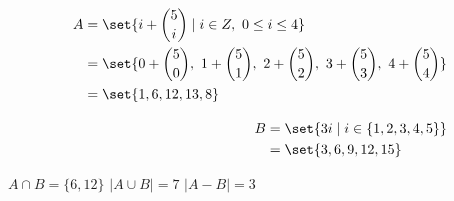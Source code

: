 \documentclass[12pt,twoside]{article}
\begin{document}


\begin{problems}

\problem %
\begin{align}
    \begin{split}
    A &= \set{ i+\binom{5}{i} \mid i \in Z, \ 0 \leq i \leq 4}  \\
      &= \set{ 0+\binom{5}{0}, 
              \ 1+\binom{5}{1}, 
              \ 2+\binom{5}{2}, 
              \ 3+\binom{5}{3}, 
              \ 4+\binom{5}{4}}  \\
      &= \set{ 1,6,12,13,8 }  \\
    \end{split}
    \\[2ex]
    \begin{split}
    B &= \set{ 3i \mid i \in \{ 1,2,3,4,5\}}  \\
      &= \set{3, 6, 9, 12, 15}  \\
    \end{split}
\end{align}

\begin{problemparts}
    \problempart $A \cap B = \{6, 12\}$ %
    \problempart $|A \cup B| = 7$ %
    \problempart $|A - B| = 3$ %
\end{problemparts}


\end{problems}
\end{document}
